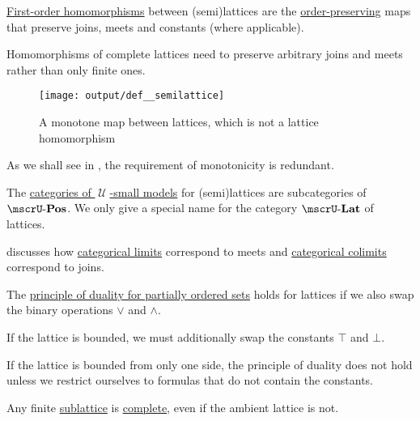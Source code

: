 \begin{definition}
\begin{thmenum}[resume=def:semilattice]
     \hyperref[def:first_order_homomorphism]{First-order homomorphisms} between (semi)lattices are the \hyperref[def:order_homomorphism/increasing]{order-preserving} maps that preserve joins, meets and constants (where applicable).

    Homomorphisms of complete lattices need to preserve arbitrary joins and meets rather than only finite ones.

    \begin{figure}[!ht]
      \centering
      \texttt{[image: output/def\_\_semilattice]}
      \caption{A monotone map between lattices, which is not a lattice homomorphism}
      \label{fig:def:semilattice/homomorphism/monotone_map_not_homomorphism}
    \end{figure}

    As we shall see in , the requirement of monotonicity is redundant.

     The \hyperref[def:category_of_small_first_order_models]{categories of \( \mscrU \)-small models} for (semi)lattices are subcategories of \hyperref[def:partially_ordered_set]{\( \ucat{Pos} \)}. We only give a special name for the category \( \ucat{Lat} \) of lattices.

     discusses how \hyperref[def:category_of_cones/limit]{categorical limits} correspond to meets and \hyperref[def:category_of_cones/colimit]{categorical colimits} correspond to joins.

     The \hyperref[thm:preorder_duality]{principle of duality for partially ordered sets} holds for lattices if we also swap the binary operations \( \vee \) and \( \wedge \).

    If the lattice is bounded, we must additionally swap the constants \( \top \) and \( \bot \).

    If the lattice is bounded from only one side, the principle of duality does not hold unless we restrict ourselves to formulas that do not contain the constants.
  \end{thmenum}
\end{definition}

\begin{example}\label{ex:complete_sublattice_of_incomplete_lattice}
  Any finite \hyperref[def:semilattice/submodel]{sublattice} is \hyperref[def:semilattice/complete]{complete}, even if the ambient lattice is not.
\end{example}

